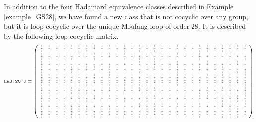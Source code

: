 \documentclass[11pt,a4paper]{article}
\begin{document}
In addition to the four Hadamard equivalence classes described in Example \ref{example_GS28}, we have found a new class that is not cocyclic over any group, but it is loop-cocyclic over the unique Moufang-loop of order $28$. It is described by the following loop-cocyclic matrix.
\[\texttt{had.28.6}\equiv {\fontsize{4}{5}\selectfont \left( \begin{array}{cccccccccccccccccccccccccccc}
+&+&+&+&+&+&+&+&+&+&+&+&+&+&+&+&+&+&+&+&+&+&+&+&+&+&+&+\\
+&-&-&+&-&+&-&+&+&-&-&+&+&-&+&-&+&+&-&-&+&-&+&-&+&+&-&-\\
+&-&+&-&-&+&+&-&-&-&-&+&-&+&-&+&-&-&-&+&+&+&+&+&+&+&-&-\\
+&-&+&-&-&-&-&+&-&+&+&+&+&-&-&-&+&+&+&+&-&+&-&+&-&+&-&-\\
+&-&-&+&-&-&-&-&+&+&+&-&-&+&+&-&+&-&-&+&+&+&+&+&-&-&+&-\\
+&+&-&+&+&-&-&+&-&-&-&+&-&+&+&+&+&-&-&-&-&+&-&+&-&+&-&+\\
+&+&+&-&-&-&-&-&+&-&-&-&+&+&+&+&-&+&+&-&-&-&+&+&-&+&+&-\\
+&+&-&+&-&-&+&-&-&+&-&+&+&-&-&+&+&-&+&-&-&+&+&-&+&-&+&-\\
+&-&-&-&+&-&+&+&+&+&-&-&-&-&+&+&-&+&+&-&+&+&-&+&+&-&-&-\\
+&-&+&+&+&-&+&-&-&-&+&-&+&-&+&-&-&-&+&-&+&+&+&-&-&+&-&+\\
+&-&-&-&+&+&-&-&-&+&-&-&+&+&-&-&+&-&+&-&+&-&-&+&+&+&+&+\\
+&+&+&+&-&+&-&+&-&+&-&-&-&-&+&-&-&-&+&+&-&-&+&+&+&-&-&+\\
+&+&-&-&-&+&+&+&-&-&+&-&+&+&+&+&+&-&+&+&+&-&-&-&-&-&-&-\\
+&+&-&-&+&+&-&-&+&-&+&+&-&-&+&-&-&-&+&+&-&+&-&-&+&+&+&-\\
+&-&-&+&-&-&+&+&+&-&+&-&+&-&-&+&-&-&-&+&-&-&-&+&+&+&+&+\\
+&+&-&+&-&-&+&-&+&+&-&+&-&+&-&-&-&+&+&+&+&-&-&-&-&+&-&+\\
+&-&-&-&+&-&-&-&-&+&+&+&+&+&+&+&-&+&-&+&-&-&+&-&+&-&-&+\\
+&-&+&-&-&+&+&+&+&+&-&+&+&+&+&-&-&-&-&-&-&+&-&-&-&-&+&+\\
+&+&-&-&+&+&+&-&+&-&-&-&+&-&-&-&+&+&-&+&-&+&+&+&-&-&-&+\\
+&+&-&-&-&+&-&+&-&+&+&-&-&-&-&+&-&+&-&-&+&+&+&-&-&+&+&+\\
+&-&-&+&+&+&+&+&-&-&+&+&-&+&-&-&-&+&+&-&-&-&+&+&-&-&+&-\\
+&+&+&-&-&-&+&-&-&-&+&+&-&-&+&-&+&+&-&-&+&-&-&+&+&-&+&+\\
+&-&+&+&-&+&-&-&+&-&+&-&-&+&-&+&+&+&+&-&-&+&-&-&+&-&-&+\\
+&+&+&-&+&-&+&+&+&+&+&-&-&+&-&-&+&-&-&-&-&-&+&-&+&+&-&-\\
+&-&+&+&+&+&+&-&-&+&-&-&-&-&+&+&+&+&-&+&-&-&-&-&-&+&+&-\\
+&-&+&-&+&-&-&+&+&-&-&+&-&-&-&+&+&-&+&+&+&-&+&-&-&-&+&+\\
+&+&+&+&+&+&-&-&+&+&+&+&+&-&-&+&-&-&-&-&+&-&-&+&-&-&-&-\\
+&+&+&+&+&-&-&+&-&-&-&-&+&+&-&-&-&+&-&+&+&+&-&-&+&-&+&-
  \end{array}
  \right)}\]
\end{document}
